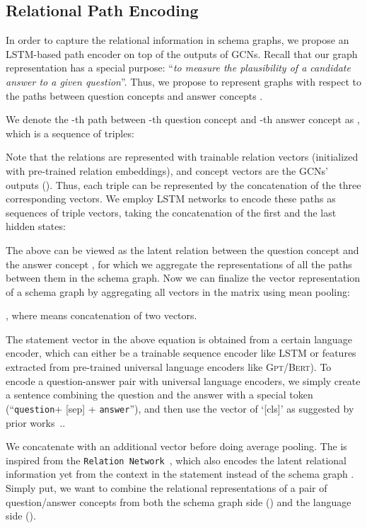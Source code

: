 \documentclass[11pt,a4paper]{article}
\newlength{\HeightReference}
\newcommand{\MyColorBox}[2][red]{\settowidth{\Width}{#2}\colorbox{#1}{\raisebox{-\DepthReference}{\parbox[b][\HeightReference+\DepthReference][c]{\Width}{\centering#2}}}}
\begin{document}
 

\subsection{Relational Path Encoding}
\label{sec:lstm}
In order to capture the relational information in schema graphs, we propose an LSTM-based path encoder on top of the outputs of GCNs. 
Recall that our graph representation has a special purpose: ``\textit{to measure the plausibility of a candidate answer to a given question}''. 
Thus, we propose to represent graphs with respect to the paths between question concepts  and answer concepts . 

We denote the -th path between -th question concept  and -th answer concept  as , which is a sequence of triples: 


Note that the relations are represented with trainable relation vectors (initialized with pre-trained relation embeddings), and concept vectors are the GCNs' outputs ().
Thus, each triple can be represented by the concatenation of the three corresponding vectors. 
We employ LSTM networks to encode these paths as sequences of triple vectors, taking the concatenation of the first and the last hidden states:



The above  can be viewed as the latent relation between the question concept  and the answer concept , for which we aggregate the representations of all the paths between them in the schema graph.
Now we can finalize the vector representation of a schema graph  by aggregating all vectors in the matrix  using mean pooling:

, where  means concatenation of two vectors.

The statement vector  in the above equation is obtained from a certain language encoder, which can either be a trainable sequence encoder like LSTM or features extracted from pre-trained universal language encoders like \textsc{Gpt}/\textsc{Bert}). {To encode a question-answer pair with universal language encoders,
we simply create a  sentence combining the question and the answer with a special token (``\texttt{question}+ [sep] + \texttt{answer}''), and then use the vector of `[cls]' as suggested by prior works~\cite{Talmor2018CommonsenseQAAQ}.}.

We concatenate \MyColorBox[cyan!10]{} with an additional vector \MyColorBox[yellow!10]{} before doing average pooling.
The  is inspired from the \texttt{Relation Network}~\cite{Santoro2017ASN}, which also encodes the latent relational information yet from the context in the statement  instead of the schema graph . 
Simply put, we want to combine the relational representations of a pair of question/answer concepts from both the schema graph side (\MyColorBox[cyan!10]{symbolic space}) and the language side (\MyColorBox[yellow!10]{semantic space}).
\end{document}
